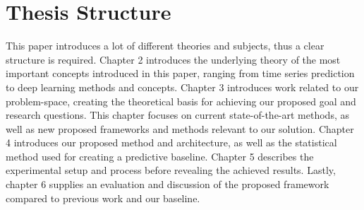 
\section{Thesis Structure}
\label{sections:Introduction:Structure}

This paper introduces a lot of different theories and subjects,
thus a clear structure is required.
Chapter 2 introduces the underlying theory of the most important concepts introduced in this paper,
ranging from time series prediction to deep learning methods and concepts.
Chapter 3 introduces work related to our problem-space, creating the theoretical basis for achieving our proposed goal and research questions.
This chapter focuses on current state-of-the-art methods,
as well as new proposed frameworks and methods relevant to our solution.
Chapter 4 introduces our proposed method and architecture, as well as the statistical method used for creating a predictive baseline.
Chapter 5 describes the experimental setup and process before revealing the achieved results.
Lastly, chapter 6 supplies an evaluation and discussion of the proposed framework compared to previous work and our baseline.


\iffalse
This section provides the reader with an overview of what is coming in the next chapters.
You want to say more than what is explicit in the chapter name,
if possible, but still keep the description short and to the point. 
\fi
